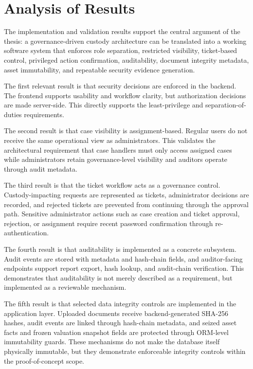 \documentclass[12pt,a4paper]{report}
\begin{document}
\section{Analysis of Results}

The implementation and validation results support the central argument of the thesis: a governance-driven custody architecture can be translated into a working software system that enforces role separation, restricted visibility, ticket-based control, privileged action confirmation, auditability, document integrity metadata, asset immutability, and repeatable security evidence generation.

The first relevant result is that security decisions are enforced in the backend. The frontend supports usability and workflow clarity, but authorization decisions are made server-side. This directly supports the least-privilege and separation-of-duties requirements.

The second result is that case visibility is assignment-based. Regular users do not receive the same operational view as administrators. This validates the architectural requirement that case handlers must only access assigned cases while administrators retain governance-level visibility and auditors operate through audit metadata.

The third result is that the ticket workflow acts as a governance control. Custody-impacting requests are represented as tickets, administrator decisions are recorded, and rejected tickets are prevented from continuing through the approval path. Sensitive administrator actions such as case creation and ticket approval, rejection, or assignment require recent password confirmation through re-authentication.

The fourth result is that auditability is implemented as a concrete subsystem. Audit events are stored with metadata and hash-chain fields, and auditor-facing endpoints support report export, hash lookup, and audit-chain verification. This demonstrates that auditability is not merely described as a requirement, but implemented as a reviewable mechanism.

The fifth result is that selected data integrity controls are implemented in the application layer. Uploaded documents receive backend-generated SHA-256 hashes, audit events are linked through hash-chain metadata, and seized asset facts and frozen valuation snapshot fields are protected through ORM-level immutability guards. These mechanisms do not make the database itself physically immutable, but they demonstrate enforceable integrity controls within the proof-of-concept scope.
\end{document}
